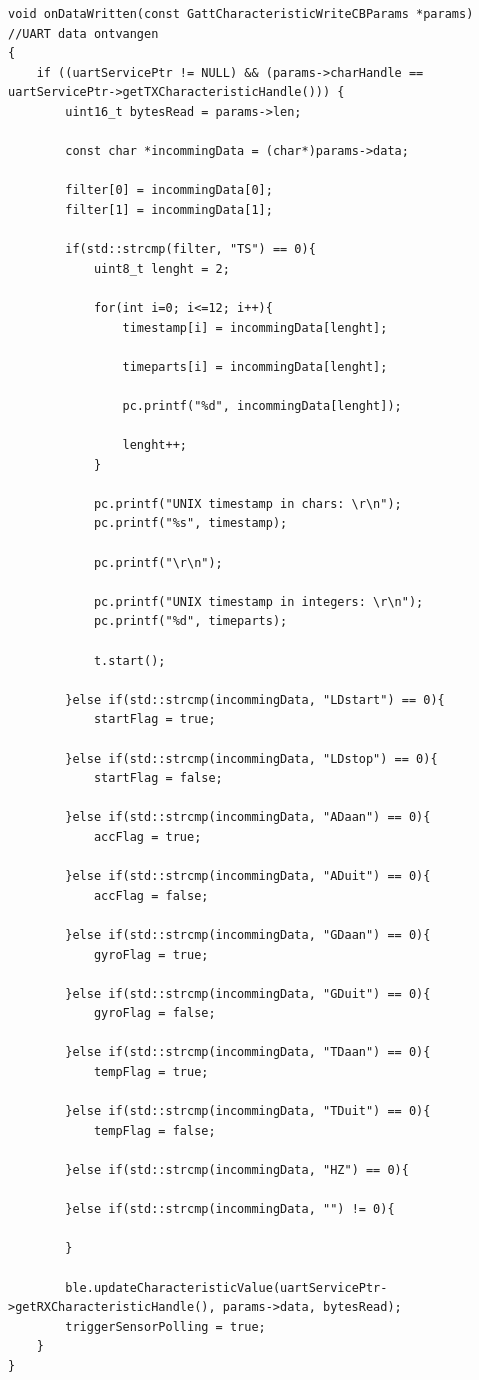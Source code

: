 \documentclass[12pt,a4paper]{report}
\begin{document}
\begin{lstlisting}
void onDataWritten(const GattCharacteristicWriteCBParams *params)                    //UART data ontvangen 
{
    if ((uartServicePtr != NULL) && (params->charHandle == uartServicePtr->getTXCharacteristicHandle())) {
        uint16_t bytesRead = params->len;
        
        const char *incommingData = (char*)params->data;
        
        filter[0] = incommingData[0];
        filter[1] = incommingData[1];
       
        if(std::strcmp(filter, "TS") == 0){
            uint8_t lenght = 2;
            
            for(int i=0; i<=12; i++){
                timestamp[i] = incommingData[lenght];  

                timeparts[i] = incommingData[lenght];

                pc.printf("%d", incommingData[lenght]);
                
                lenght++;
            }
            
            pc.printf("UNIX timestamp in chars: \r\n");
            pc.printf("%s", timestamp);
            
            pc.printf("\r\n");

            pc.printf("UNIX timestamp in integers: \r\n");
            pc.printf("%d", timeparts);

            t.start();
            
        }else if(std::strcmp(incommingData, "LDstart") == 0){
            startFlag = true;
            
        }else if(std::strcmp(incommingData, "LDstop") == 0){
            startFlag = false;
            
        }else if(std::strcmp(incommingData, "ADaan") == 0){
            accFlag = true;
            
        }else if(std::strcmp(incommingData, "ADuit") == 0){
            accFlag = false;
            
        }else if(std::strcmp(incommingData, "GDaan") == 0){
            gyroFlag = true;
            
        }else if(std::strcmp(incommingData, "GDuit") == 0){
            gyroFlag = false;
            
        }else if(std::strcmp(incommingData, "TDaan") == 0){
            tempFlag = true;
            
        }else if(std::strcmp(incommingData, "TDuit") == 0){
            tempFlag = false;
            
        }else if(std::strcmp(incommingData, "HZ") == 0){            
            
        }else if(std::strcmp(incommingData, "") != 0){

        }
        
        ble.updateCharacteristicValue(uartServicePtr->getRXCharacteristicHandle(), params->data, bytesRead);
        triggerSensorPolling = true;
    }
}
\end{lstlisting}
\newpage
\end{document}
